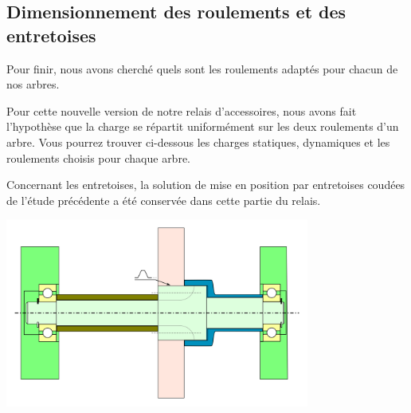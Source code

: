 \documentclass{config}
\begin{document}
\begin{spacing}{1.2}
\newpage
\subsection{Dimensionnement des roulements et des entretoises}

Pour finir, nous avons cherché quels sont les roulements adaptés pour chacun de nos arbres. 

Pour cette nouvelle version de notre relais d'accessoires, nous avons fait l'hypothèse que la charge se répartit uniformément sur les deux roulements d'un arbre. Vous pourrez trouver ci-dessous les charges statiques, dynamiques et les roulements choisis pour chaque arbre.

\begin{table}[h]
\centering
{}
\end{table}

Concernant les entretoises, la solution de mise en position par entretoises coudées de l'étude précédente a été conservée dans cette partie du relais.


\begin{center}
\includegraphics[width=0.75\textwidth]{Solution_cannelures.png}
\label{fig:entretoises}
\end{center}




\end{spacing}
\end{document}
